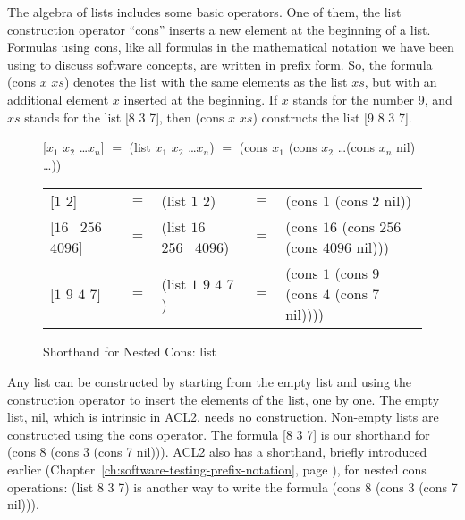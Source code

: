 The algebra of lists includes some basic operators.
One of them, the
list construction
operator ``cons''
inserts a new element at the beginning of a list.
Formulas using cons, like all formulas in
the mathematical notation we have been using to discuss software concepts,
are written in prefix form.
So, the formula (cons $x$ $xs$) denotes the list
with the same elements as the list $xs$,
but with an additional element $x$ inserted at the beginning.
If $x$ stands for the number 9,
and $xs$ stands for the list [8 3 7],
then (cons $x$ $xs$) constructs the list [9 8 3 7].

\begin{figure}
\begin{center}
[$x_1$ $x_2$ \dots $x_n$] $=$
(list $x_1$ $x_2$ \dots $x_n$) $=$ (cons $x_1$ (cons $x_2$ \dots (cons $x_n$ nil) \dots))\\
\vspace{2mm}
\begin{tabular}{lclcl}
{[$1$ $2$]}             &$=$ &(list $1$ $2$)            &$=$ &(cons $1$ (cons $2$ nil))\\
{[$16$ ~$256$ ~$4096$]} &$=$ &(list $16$ ~$256$ ~$4096$)&$=$ &(cons $16$ (cons $256$ (cons $4096$ nil)))\\
{[$1$ $9$ $4$ $7$]}     &$=$ &(list $1$ $9$ $4$ $7$)    &$=$ &(cons $1$ (cons $9$ (cons $4$ (cons $7$ nil))))
\end{tabular}
\end{center}
\caption{Shorthand for Nested Cons: list}
\label{fig:list-nested-cons}
\end{figure}

Any list can be constructed by starting from the empty list
and using the construction operator to insert the elements of the list, one by one.
The empty list, nil, which is intrinsic in ACL2, needs no construction.
Non-empty lists are constructed using the cons operator.
The formula [8 3 7] is our shorthand for (cons 8 (cons 3 (cons 7 nil))).
ACL2 also has a shorthand, briefly introduced earlier
(Chapter~\ref{ch:software-testing-prefix-notation}, page \pageref{list-op-informal}),
for nested cons operations: (list 8 3 7) is another way to write the formula
(cons 8 (cons 3 (cons 7 nil))).

